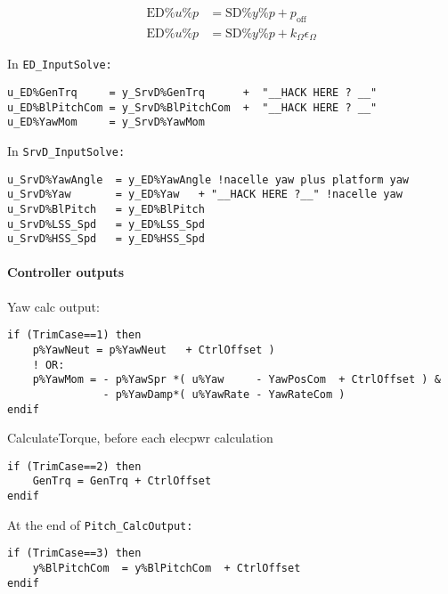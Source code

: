 \documentclass[11pt]{article}
\begin{document}
% 
\begin{align}
    \text{ED}\%u\%p &= \text{SD}\%y\%p + p_\text{off}\\
    \text{ED}\%u\%p &= \text{SD}\%y\%p + k_\Omega \epsilon_\Omega
\end{align}


In \tt{ED\_InputSolve}:
\fortran
\begin{lstlisting}
u_ED%GenTrq     = y_SrvD%GenTrq      +  "__HACK HERE ? __"
u_ED%BlPitchCom = y_SrvD%BlPitchCom  +  "__HACK HERE ? __"
u_ED%YawMom     = y_SrvD%YawMom
\end{lstlisting}

In \tt{SrvD\_InputSolve}:
\begin{lstlisting}
u_SrvD%YawAngle  = y_ED%YawAngle !nacelle yaw plus platform yaw
u_SrvD%Yaw       = y_ED%Yaw   + "__HACK HERE ?__" !nacelle yaw
u_SrvD%BlPitch   = y_ED%BlPitch
u_SrvD%LSS_Spd   = y_ED%LSS_Spd
u_SrvD%HSS_Spd   = y_ED%HSS_Spd
\end{lstlisting}

\paragraph{Controller outputs}
Yaw calc output: 
\begin{lstlisting}
if (TrimCase==1) then
    p%YawNeut = p%YawNeut   + CtrlOffset ) 
    ! OR:
    p%YawMom = - p%YawSpr *( u%Yaw     - YawPosCom  + CtrlOffset ) &   
               - p%YawDamp*( u%YawRate - YawRateCom )                
endif
\end{lstlisting}
CalculateTorque, before each elecpwr calculation
\begin{lstlisting}
if (TrimCase==2) then
    GenTrq = GenTrq + CtrlOffset
endif
\end{lstlisting}
At the end of \tt{Pitch\_CalcOutput}:
\begin{lstlisting}
if (TrimCase==3) then
    y%BlPitchCom  = y%BlPitchCom  + CtrlOffset
endif
\end{lstlisting}
% 




%
%
\end{document}
